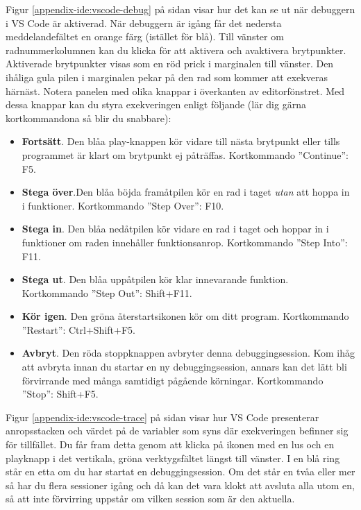 Figur \ref{appendix-ide:vscode-debug} på sidan \pageref{appendix-ide:vscode-debug} visar hur det kan se ut när debuggern i VS Code är aktiverad. När debuggern är igång får det nedersta meddelandefältet en orange färg (istället för blå). Till vänster om radnummerkolumnen kan du klicka för att aktivera och avaktivera brytpunkter. Aktiverade brytpunkter visas som en röd prick i marginalen till vänster. Den ihåliga gula pilen i marginalen pekar på den rad som kommer att exekveras härnäst. Notera panelen med olika knappar i överkanten av editorfönstret. Med dessa knappar kan du styra exekveringen enligt följande (lär dig gärna kortkommandona så blir du snabbare):
\begin{itemize}
  \item \textbf{Fortsätt}. Den blåa play-knappen kör vidare till nästa brytpunkt eller tills programmet är klart om brytpunkt ej påträffas. Kortkommando ''Continue'': F5.
  \item \textbf{Stega över}.Den blåa böjda framåtpilen kör en rad i taget \emph{utan} att hoppa in i funktioner.  Kortkommando ''Step Over'': F10.
  \item \textbf{Stega in}. Den blåa nedåtpilen kör vidare en rad i taget och hoppar in i funktioner om raden innehåller funktionsanrop. Kortkommando ''Step Into'': F11.
  \item \textbf{Stega ut}. Den blåa uppåtpilen kör klar innevarande funktion. Kortkommando ''Step Out'': Shift+F11.
  \item \textbf{Kör igen}. Den gröna återstartsikonen kör om ditt program. Kortkommando ''Restart'': Ctrl+Shift+F5.
  \item \textbf{Avbryt}. Den röda stoppknappen avbryter denna debuggingsession. Kom ihåg att avbryta innan du startar en ny debuggingsession, annars kan det lätt bli förvirrande med många samtidigt pågående körningar. Kortkommando ''Stop'': Shift+F5. 
\end{itemize}

Figur \ref{appendix-ide:vscode-trace} på sidan \pageref{appendix-ide:vscode-trace} visar hur VS Code presenterar anropsstacken och värdet på de variabler som syns där exekveringen befinner sig för tillfället. Du får fram detta genom att klicka på ikonen med en lus och en playknapp i det vertikala, gröna verktygsfältet längst till vänster. I en blå ring står en etta om du har startat en debuggingsession. Om det står en tvåa eller mer så har du flera sessioner igång och då kan det vara klokt att avsluta alla utom en, så att inte förvirring uppstår om vilken session som är den aktuella. 

